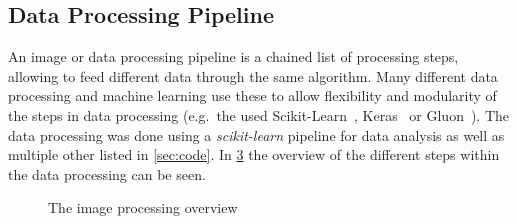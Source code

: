 \documentclass[12pt,a4paper, english,twoside]{scrartcl}
\begin{document}
    \subsection{Data Processing Pipeline}\label{sec:pipeline}
      An image or data processing pipeline is a chained list of processing steps, allowing to feed different data through the same algorithm. 
      Many different data processing and machine learning  use these to allow flexibility and modularity of the steps in data processing (e.g.\ the used Scikit-Learn~\autocite{scikit-learn}, Keras~\autocite{keras} or Gluon~\autocite{gluon}). 
      The data processing was done using a \textit{scikit-learn} pipeline for data analysis as well as multiple other  listed in \cref{sec:code}.
      In \cref{fig:pipeline} the overview of the different steps within the data processing can be seen.
      \begin{figure}[!htbp]
         \begin{subfigure}[b]{0.40\textwidth}
           
           \label{fig:pipelineTraining}
         \end{subfigure}
         \begin{subfigure}[b]{0.40\textwidth}
           
           \label{fig:pipelineTrained}
         \end{subfigure}
         \caption{The image processing overview\label{fig:pipeline}}
       \end{figure}
       \newpage
\end{document}
